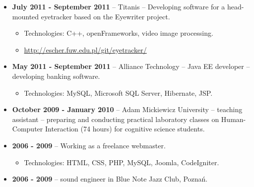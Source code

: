 \documentclass[10pt]{article}
\renewcommand{\section}[2]%
        {\pagebreak[2]\vspace{1.3\baselineskip}%
         \phantomsection\addcontentsline{toc}{section}{#1}%
         \hspace{0in}%
         \marginpar{
         \raggedright \scshape #1}#2}
\newenvironment{outerlist}[1][\enskip\textbullet]%
        {\begin{itemize}[#1]}{\end{itemize}%
         \vspace{-.6\baselineskip}}
\begin{document}
\begin{outerlist}
\item[] \textbf{July 2011 - September 2011} -- Titanis -- Developing software for a head-mounted eyetracker based on the Eyewriter project.
\begin{itemize}
	\item Technologies: C++, openFrameworks, video image processing.
	\item \url{http://escher.fuw.edu.pl/git/eyetracker/}
\end{itemize}

\item[] \textbf{May 2011 - September 2011} -- Alliance Technology -- Java EE developer -- developing banking software.
\begin{itemize}
	\item Technologies: MySQL, Microsoft SQL Server, Hibernate, JSP.
\end{itemize}

\item[] \textbf{October 2009 - January 2010} -- Adam Mickiewicz University -- teaching assistant --
preparing and conducting practical laboratory classes on Human-Computer Interaction
(74 hours) for cognitive science students.

\item[] \textbf{2006 - 2009} -- Working as a freelance webmaster. 
\begin{itemize}
	\item Technologies: HTML, CSS, PHP, MySQL, Joomla, CodeIgniter.%
\end{itemize}

\item[] \textbf{2006 - 2009} -- sound engineer in Blue Note Jazz Club, Poznań.

\end{outerlist}




\end{document}
